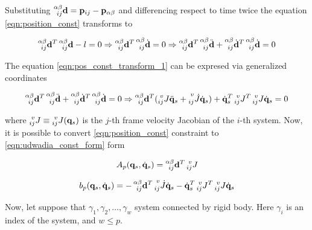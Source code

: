 Substituting 
$\prescript{\alpha \beta}{ij}{\mathbf{d}} = \mathbf{p}_{ij} - \mathbf{p}_{\alpha \beta}$ 
and differencing respect to time twice the equation \ref{eqn:position_const}
transforms to 

\begin{equation}
    \label{eqn:pos_const_transform_1}
    \prescript{\alpha \beta}{ij}{\mathbf{d}}^T 
    \prescript{\alpha \beta}{ij}{\mathbf{d}} - l = 0
    \Rightarrow
    \prescript{\alpha \beta}{ij}{\mathbf{d}}^T 
    \prescript{\alpha \beta}{ij}{\dot{\mathbf{d}}} = 0
    \Rightarrow
    \prescript{\alpha \beta}{ij}{\mathbf{d}}^T 
    \prescript{\alpha \beta}{ij}{\ddot{\mathbf{d}}} + 
    \prescript{\alpha \beta}{ij}{\dot{\mathbf{d}}}^T 
    \prescript{\alpha \beta}{ij}{\dot{\mathbf{d}}} = 0
\end{equation}

The equation \ref{eqn:pos_const_transform_1} can be expresed via generalized coordinates

\begin{equation}
    \label{eqn:pos_const_transform_2}
    \prescript{\alpha \beta}{ij}{\mathbf{d}}^T 
    \prescript{\alpha \beta}{ij}{\ddot{\mathbf{d}}} + 
    \prescript{\alpha \beta}{ij}{\dot{\mathbf{d}}}^T 
    \prescript{\alpha \beta}{ij}{\dot{\mathbf{d}}} = 0
    \Rightarrow
    \prescript{\alpha \beta}{ij}{\mathbf{d}}^T 
    (
        \prescript{v}{ij}{J} \ddot{\mathbf{q}}_s + 
        \prescript{v}{ij}{\dot{J}} \dot{\mathbf{q}}_s
    ) + 
    \dot{\mathbf{q}}_s^T \prescript{v}{ij}{J}^T 
    \prescript{v}{ij}{J} \dot{\mathbf{q}}_s = 0
\end{equation}

where $\prescript{v}{ij}{J} \equiv \prescript{v}{ij}{J}(\mathbf{q}_s)$ is the 
$j$-th frame velocity Jacobian of the $i$-th system. Now, it is possible to 
convert \ref{eqn:position_const} constraint to \ref{eqn:udwadia_const_form} form

\begin{equation}
    \label{eqn:pos_const_a_matrix}
    A_p(\mathbf{q}_s, \dot{\mathbf{q}}_s) = 
    \prescript{\alpha \beta}{ij}{\mathbf{d}}^T \prescript{v}{ij}{J}
\end{equation}

\begin{equation}
    \label{eqn:pos_const_b_vector}
    b_p(\mathbf{q}_s, \dot{\mathbf{q}}_s) = 
    - \prescript{\alpha \beta}{ij}{\mathbf{d}}^T 
    \prescript{v}{ij}{\dot{J}} \dot{\mathbf{q}}_s
    - \dot{\mathbf{q}}_s^T \prescript{v}{ij}{J}^T
    \prescript{v}{ij}{J} \dot{\mathbf{q}}_s
\end{equation}

Now, let suppose that $\gamma_1, \gamma_2, \dots, \gamma_w$ system connected by rigid 
body. Here $\gamma_i$ is an index of the system, and $w \leq p$. 
